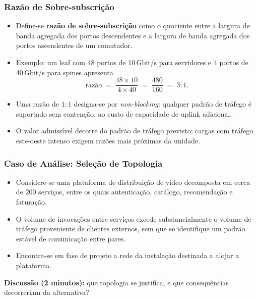 \documentclass[aspectratio=169]{beamer}
\begin{document}
\begin{frame}
\frametitle{Razão de Sobre-subscrição}
\begin{itemize}
    \setlength\itemsep{0.35cm}
    \item Define-se \textbf{razão de sobre-subscrição} como o quociente entre a largura de banda agregada dos portos descendentes e a largura de banda agregada dos portos ascendentes de um comutador.
    \item Exemplo: um leaf com 48 portos de 10\,Gbit/s para servidores e 4 portos de 40\,Gbit/s para spines apresenta
    \[
      \text{razão} \;=\; \frac{48 \times 10}{4 \times 40} \;=\; \frac{480}{160} \;=\; 3{:}1 .
    \]
    \item Uma razão de $1{:}1$ designa-se por \emph{non-blocking}: qualquer padrão de tráfego é suportado sem contenção, ao custo de capacidade de uplink adicional.
    \item O valor admissível decorre do padrão de tráfego previsto; cargas com tráfego este-oeste intenso exigem razões mais próximas da unidade.
\end{itemize}
\end{frame}

\begin{frame}
\frametitle{Caso de Análise: Seleção de Topologia}
\begin{itemize}
    \setlength\itemsep{0.35cm}
    \item Considere-se uma plataforma de distribuição de vídeo decomposta em cerca de 200 serviços, entre os quais autenticação, catálogo, recomendação e faturação.
    \item O volume de invocações entre serviços excede substancialmente o volume de tráfego proveniente de clientes externos, sem que se identifique um padrão estável de comunicação entre pares.
    \item Encontra-se em fase de projeto a rede da instalação destinada a alojar a plataforma.
\end{itemize}
\vspace{0.2cm}
{\small\color{NudeTaupe}\textbf{Discussão (2 minutos):} que topologia se justifica, e que consequências decorreriam da alternativa?}
\end{frame}
\end{document}
